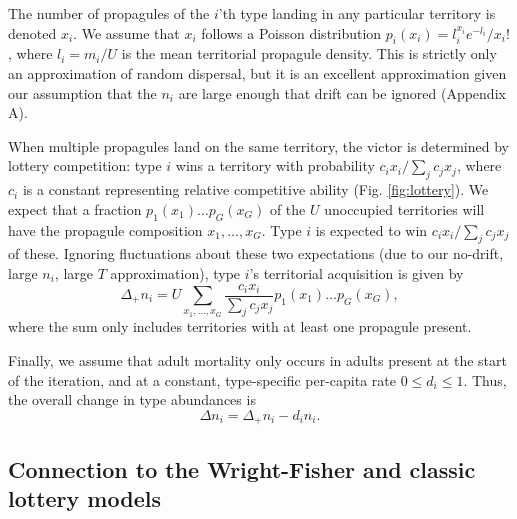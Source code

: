 \documentclass[11pt]{article}
\begin{document}
The number of propagules of the $i$'th type landing in any particular territory is denoted $x_i$. We assume that $x_i$ follows a Poisson distribution $p_i(x_i)=l_i^{x_i} e^{-l_i}/x_i!$, where $l_i=m_i/U$ is the mean territorial propagule density. This is strictly only an approximation of random dispersal, but it is an excellent approximation given our assumption that the $n_i$ are large enough that drift can be ignored (Appendix A).

When multiple propagules land on the same territory, the victor is determined by lottery competition: type $i$ wins a territory with probability $c_i x_i/\sum_j c_j x_j$, where $c_i$ is a constant representing relative competitive ability (Fig. \ref{fig:lottery}). We expect that a fraction $p_1(x_1)\ldots p_G(x_G)$ of the $U$ unoccupied territories will have the propagule composition $x_1,\ldots,x_G$. Type $i$ is expected to win $c_i x_i/\sum_j c_j x_j$ of these. Ignoring fluctuations about these two expectations (due to our no-drift, large $n_i$, large $T$ approximation), type $i$'s territorial acquisition is given by
\begin{equation}
\Delta_+ n_i=U\sum_{x_1,\ldots,x_G} \frac{c_i x_i}{\sum_j c_j x_j} p_1(x_1)\ldots p_G(x_G), \label{eq:growthsumuncoupled}
\end{equation}
where the sum only includes territories with at least one propagule present.

Finally, we assume that adult mortality only occurs in adults present at the start of the  iteration, and at a constant, type-specific per-capita rate $0\leq d_i\leq 1$. Thus, the overall change in type abundances is
\begin{equation}
\Delta n_i=\Delta_+ n_i-d_i n_i. \label{eq:delttot}
\end{equation}

\subsection*{Connection to the Wright-Fisher and classic lottery models}
\end{document}
